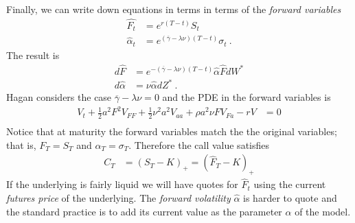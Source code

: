 \documentclass[10pt]{article}
\numberwithin{equation}{section}
\begin{document}
Finally, we can write down equations in terms in terms of the \emph{forward variables}
\begin{equation*}
	\begin{split}
	 \widehat{F_t} &= e^{r(T-t)} S_t \\
	 \widehat{\alpha}_t &= e^{(\overline{\gamma}-\lambda \nu)(T-t)}\sigma_t \:. 
	\end{split}
\end{equation*}
The result is
\begin{equation}\label{SABR}
	\begin{split}
		d\widehat{F} &= e^{-(\overline{\gamma}-\lambda \nu)(T-t)}\widehat{\alpha} \widehat{F} dW^{*}\\
		d \widehat{\alpha }&= \nu \widehat{\alpha} dZ^{*}\:.
	\end{split}
\end{equation}
Hagan considers the case $\overline{\gamma}-\lambda \nu=0$ and the PDE in the forward variables is
\begin{equation}\label{Hagan_V}
	\begin{split}
	V_t + \frac{1}{2} a^2 F^2 V_{FF}+ \frac{1}{2} \nu^2 a^2 V_{aa}  + \rho a^2 \nu F V_{Fa} - r V&=0\\
	\end{split}
\end{equation}
Notice that at maturity the forward variables match the the original variables; that is, $F_T=S_T$ and $\widehat{\alpha}_T = \sigma_{T}$. Therefore the call value satisfies
\begin{equation*}
	\begin{split}
		C_{T} &= (S_T - K)_{+}= (\widehat{F}_T-K)_{+}
	\end{split}
\end{equation*}
If the underlying is fairly liquid we will have quotes for $\widehat{F}_{t}$ using the current \emph{futures price} of the underlying. The \emph{forward volatility} $\widehat{\alpha}$ is harder to quote and the standard practice is to add its current value as the parameter $\alpha$ of the model.
\end{document}
